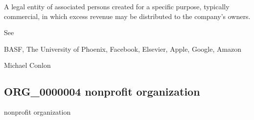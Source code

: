 \documentclass[letterpaper,10pt,english]{sphinxmanual}
\begin{document}
\begin{sphinxShadowBox}

\sphinxAtStartPar
A legal entity of associated persons created for a specific purpose, typically commercial, in which excess revenue may be distributed to the company’s owners.
\end{sphinxShadowBox}

\begin{sphinxShadowBox}

\sphinxAtStartPar
See 
\end{sphinxShadowBox}

\begin{sphinxShadowBox}

\sphinxAtStartPar
BASF, The University of Phoenix, Facebook, Elsevier, Apple, Google, Amazon
\end{sphinxShadowBox}

\begin{sphinxShadowBox}

\sphinxAtStartPar
{}
\end{sphinxShadowBox}

\begin{sphinxShadowBox}

\sphinxAtStartPar
Michael Conlon 
\end{sphinxShadowBox}
\begin{quote}

\ignorespaces \end{quote}


\subsection{ORG\_0000004 \sphinxhyphen{} nonprofit organization}
\label{\detokenize{doc-ORG_0000004:org-0000004-nonprofit-organization}}\label{\detokenize{doc-ORG_0000004:index-0}}\label{\detokenize{doc-ORG_0000004::doc}}
\begin{sphinxShadowBox}

\sphinxAtStartPar
nonprofit organization
\end{sphinxShadowBox}
\end{document}
